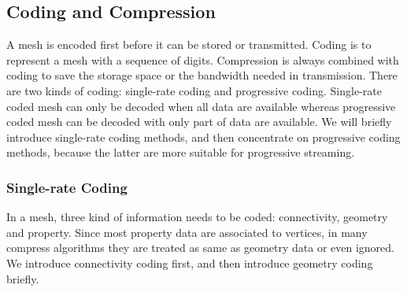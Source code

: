 \documentclass[11pt, a4paper]{report}
\begin{document}
    \subsection{Coding and Compression}
    A mesh is encoded first before it can be stored or
    transmitted. Coding is to represent a mesh with a sequence of
    digits. Compression is always combined with coding to save the storage space
    or the bandwidth needed in transmission. 
    There are two kinds of coding:
    single-rate coding and progressive coding. 
    Single-rate coded mesh can only be decoded when all data are available 
    whereas progressive coded mesh can be decoded with only part of data are available. 
    We will briefly introduce single-rate coding methods, and then concentrate on
    progressive coding methods, because the latter are more suitable for progressive streaming.
    \subsubsection{Single-rate Coding} \label{single_rate}
    In a mesh, three kind of information needs to be coded:
    connectivity, geometry and property. 
    Since most property data are associated to vertices, 
    in many compress algorithms they are treated as same as geometry data or even
    ignored. We introduce connectivity coding first, and then introduce geometry coding briefly.
    
\end{document}
